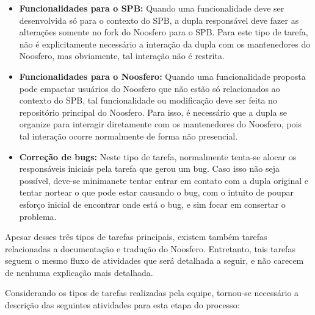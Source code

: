 \documentclass[a4paper, 11pt]{article}
\begin{document}
\begin{itemize}
    \item \textbf{Funcionalidades para o SPB:} Quando uma funcionalidade deve
        ser desenvolvida só para o contexto do SPB, a dupla responsável deve
        fazer as alterações somente no fork do Noosfero para o SPB. Para este
        tipo de tarefa, não é explicitamente necessário a interação da dupla
        com os mantenedores do Noosfero, mas obviamente, tal interação não é
        restrita.
    \item \textbf{Funcionalidades para o Noosfero:} Quando uma funcionalidade
        proposta pode empactar usuários do Noosfero que não estão só
        relacionados ao contexto do SPB, tal funcionalidade ou modificação
        deve ser feita no repositório principal do Noosfero. Para isso, é
        necessário que a dupla se organize para interagir diretamente com os
        mantenedores do Noosfero, pois tal interação ocorre normalmente de
        forma não presencial.
    \item \textbf{Correção de bugs:} Neste tipo de tarefa, normalmente
        tenta-se alocar os responsáveis iniciais pela tarefa que gerou um
        bug. Caso isso não seja possível, deve-se minimanete tentar entrar em
        contato com a dupla original e tentar nortear o que pode estar
        causando o bug, com o intuito de poupar esforço inicial de encontrar
        onde está o bug, e sim focar em consertar o problema.
\end{itemize}

Apesar desses três tipos de tarefas principais, existem também tarefas
relacionadas a documentação e tradução do Noosfero. Entretanto, tais tarefas
seguem o mesmo fluxo de atividades que será detalhada a seguir, e não carecem
de nenhuma explicação mais detalhada.

Considerando os tipos de tarefas realizadas pela equipe, tornou-se necessário
a descrição das seguintes atividades para esta etapa do processo:
\end{document}
